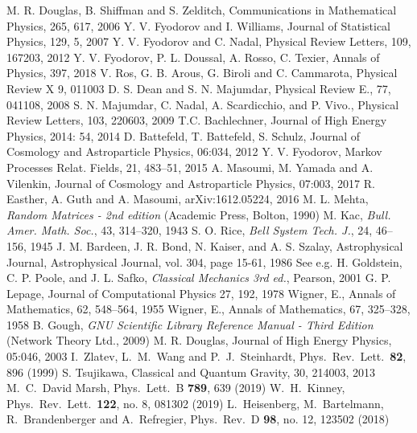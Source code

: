 \documentclass[12pt]{article}
\begin{document}
\begin{thebibliography}{99}
 M. R. Douglas, B. Shiffman and S. Zelditch, Communications in Mathematical Physics, 265, 617, 2006 
 Y. V. Fyodorov and I. Williams, Journal of Statistical Physics, 129, 5, 2007
 Y. V. Fyodorov and C. Nadal, Physical Review Letters, 109, 167203, 2012
 Y. V. Fyodorov, P. L. Doussal, A. Rosso, C. Texier, Annals of Physics, 397, 2018
  V. Ros, G. B. Arous, G. Biroli and C. Cammarota, Physical Review X 9, 011003
 D. S. Dean and S. N. Majumdar, Physical Review E., 77, 041108, 2008
 S. N. Majumdar, C. Nadal, A. Scardicchio, and P. Vivo., Physical Review Letters, 103, 220603, 2009
 T.C. Bachlechner, Journal of High Energy Physics, 2014: 54, 2014
 D. Battefeld, T. Battefeld, S. Schulz, Journal of Cosmology and Astroparticle Physics, 06:034, 2012
 Y. V. Fyodorov, Markov Processes Relat. Fields, 21, 483--51, 2015
 A. Masoumi, M. Yamada and A. Vilenkin, Journal of Cosmology and Astroparticle Physics, 07:003, 2017
 R. Easther, A. Guth and A. Masoumi, arXiv:1612.05224, 2016
 M. L. Mehta, \emph{Random Matrices - 2nd edition} (Academic Press, Bolton, 1990)
 M. Kac, \emph{Bull. Amer. Math. Soc.}, 43, 314–320, 1943
  S. O. Rice, \emph{Bell System Tech. J.}, 24, 46--156, 1945
 J. M. Bardeen, J. R. Bond, N. Kaiser, and A. S. Szalay, Astrophysical Journal, Astrophysical Journal, vol. 304, page 15-61, 1986
 See e.g. H. Goldstein, C. P. Poole, and J. L. Safko, \emph{Classical Mechanics 3rd ed.}, Pearson, 2001
 G. P. Lepage, Journal of Computational Physics 27, 192, 1978
 Wigner, E., Annals of Mathematics, 62, 548--564, 1955
 Wigner, E., Annals of Mathematics, 67, 325--328, 1958
 B. Gough, \emph{GNU Scientific Library Reference Manual - Third Edition} (Network Theory Ltd., 2009)
 M. R. Douglas, Journal of High Energy Physics, 05:046, 2003
   I.~Zlatev, L.~M.~Wang and P.~J.~Steinhardt,
  Phys.\ Rev.\ Lett.\  {\bf 82}, 896 (1999)
 S. Tsujikawa, Classical and Quantum Gravity, 30, 214003, 2013
  M.~C.~David Marsh,
  Phys.\ Lett.\ B {\bf 789}, 639 (2019)
  W.~H.~Kinney,
  Phys.\ Rev.\ Lett.\  {\bf 122}, no. 8, 081302 (2019)
  L.~Heisenberg, M.~Bartelmann, R.~Brandenberger and A.~Refregier,
   Phys.\ Rev.\ D {\bf 98}, no. 12, 123502 (2018)

\end{thebibliography}
\end{document}
